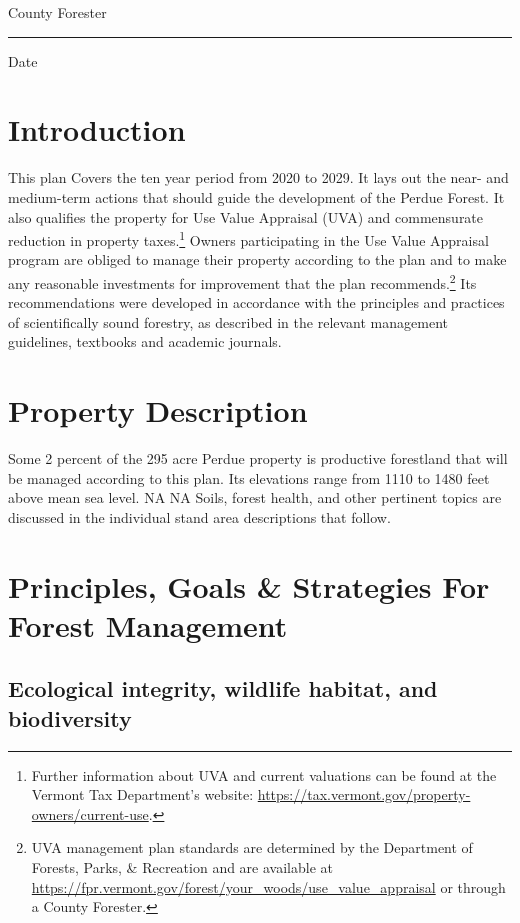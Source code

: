 \documentclass[]{tufte-handout}
\begin{document}
\noindent County Forester \rule{7cm}{0pt} Date

\pagebreak

\section{Introduction}\label{introduction}

This plan Covers the ten year period from 2020 to 2029. It lays out the
near- and medium-term actions that should guide the development of the
Perdue Forest. It also qualifies the property for Use Value Appraisal
(UVA) and commensurate reduction in property taxes.\footnote{Further
  information about UVA and current valuations can be found at the
  Vermont Tax Department's website:
  \url{https://tax.vermont.gov/property-owners/current-use}.
  \vspace{20pt}} Owners participating in the Use Value Appraisal program
are obliged to manage their property according to the plan and to make
any reasonable investments for improvement that the plan
recommends.\footnote{UVA management plan standards are determined by the
  Department of Forests, Parks, \& Recreation and are available at
  \url{https://fpr.vermont.gov/forest/your_woods/use_value_appraisal} or
  through a County Forester.} Its recommendations were developed in
accordance with the principles and practices of scientifically sound
forestry, as described in the relevant management guidelines, textbooks
and academic journals.

\section{Property Description}\label{property-description}

Some 2 percent of the 295 acre Perdue property is productive forestland
that will be managed according to this plan. Its elevations range from
1110 to 1480 feet above mean sea level. NA NA Soils, forest health, and
other pertinent topics are discussed in the individual stand area
descriptions that follow.

\section{Principles, Goals \& Strategies For Forest
Management}\label{principles-goals-strategies-for-forest-management}

\subsection{Ecological integrity, wildlife habitat, and
biodiversity}\label{ecological-integrity-wildlife-habitat-and-biodiversity}
\end{document}

